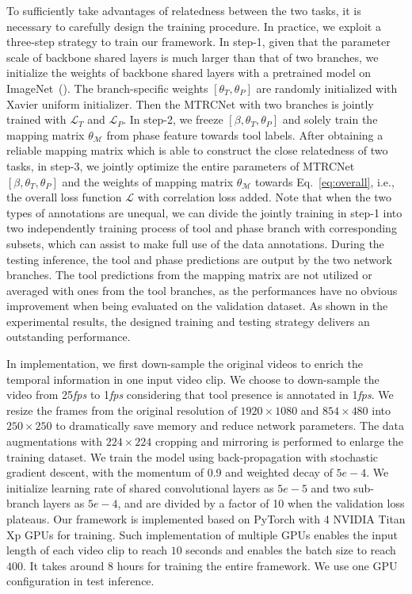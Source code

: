 \documentclass{elsarticle}
\begin{document}
To sufficiently take advantages of relatedness between the two tasks, it is necessary to carefully design the training procedure.
In practice, we exploit a three-step strategy to train our framework.
In step-1, given that the parameter scale of backbone shared layers is much larger than that of two branches,
we initialize the weights of backbone shared layers with a pretrained model on ImageNet~(\cite{he2016deep}).
The branch-specific weights $[\theta_T,\theta_P]$ are randomly initialized with Xavier uniform initializer.
Then the MTRCNet with two branches is jointly trained with $\mathcal{L}_{T}$ and $\mathcal{L}_{P}$.
In step-2, we freeze $[\beta,\theta_T,\theta_P]$ and solely train the mapping matrix $\theta_\mathcal{M}$ from phase feature towards tool labels.
After obtaining a reliable mapping matrix which is able to construct the close relatedness of two tasks, in step-3, we jointly optimize the entire parameters of MTRCNet $[\beta,\theta_T,\theta_P]$ and the weights of mapping matrix  $\theta_\mathcal{M}$ towards Eq.~\ref{eq:overall}, i.e., the overall loss function  $\mathcal{L}$ with correlation loss added. 
Note that when the two types of annotations are unequal, we can divide the jointly training in step-1 into two independently training process of tool and phase branch with corresponding subsets, which can assist to make full use of the data annotations.
During the testing inference, the tool and phase predictions are output by the two network branches. 
The tool predictions from the mapping matrix are not utilized or averaged with ones from the tool branches, as the performances have no obvious improvement when being evaluated on the validation dataset.
As shown in the experimental results, the designed training and testing strategy delivers an outstanding performance.


In implementation, we first down-sample the original videos to enrich the temporal information in one input video clip. 
We choose to down-sample the video from 25\emph{fps} to 1\emph{fps} considering that tool presence is annotated in 1\emph{fps}.
We resize the frames from the original resolution of $1920 \! \times \! 1080$ and $854 \! \times \! 480$ into $250 \!  \times \!  250$ to dramatically save memory and reduce network parameters.
The data augmentations with $224\times224$ cropping and mirroring is performed to enlarge the training dataset.
We train the model using back-propagation with stochastic gradient descent, with the momentum of 0.9 and weighted decay of $5e\!-\!4$.
We initialize learning rate of shared convolutional layers as $5e\!-\!5$ and two sub-branch layers as $5e\!-\!4$, and are divided by a factor of 10 when the validation loss plateaus.
Our framework is implemented based on PyTorch with 4 NVIDIA Titan Xp GPUs for training. 
Such implementation of multiple GPUs enables the input length of each video clip to reach $10$ seconds and enables the batch size to reach $400$.
It takes around 8 hours for training the entire framework.
We use one GPU configuration in test inference.
\end{document}
